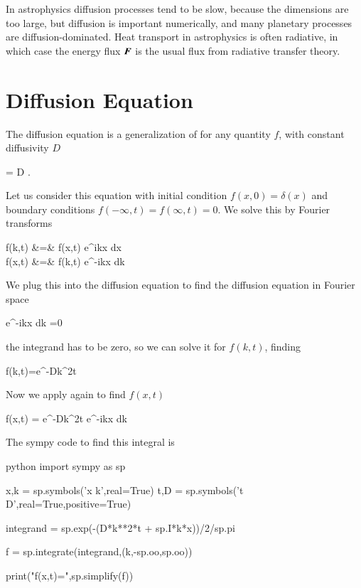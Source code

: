 In astrophysics diffusion processes tend to be slow, because the
dimensions are too large, but diffusion is important numerically, and
many planetary processes are diffusion-dominated. Heat transport in
astrophysics is often radiative, in which case the energy flux ${\boldsymbol{F}}$ is
the usual flux from radiative transfer theory. 

\section{Diffusion Equation}

The diffusion equation is a generalization of 
for any quantity $f$, with constant diffusivity $D$

\beq
{} = D .
\eeq

Let us consider this equation with initial condition $f(x,0)=\delta(x)$ and boundary conditions
$f(-\infty,t)=f(\infty,t)=0$. We solve this by Fourier transforms

\beqn
f(k,t) &=& \int f(x,t) e^{ikx} dx \label{eq:fourier-kx}\\
f(x,t) &=& \int f(k,t) e^{-ikx} dk \label{eq:fourier-xk}
\eeqn


We plug  this into the diffusion equation to find
the diffusion equation in Fourier space

\beq
\int {}e^{-ikx} dk =0
\eeq

\noindent the integrand has to be zero, so we can solve it for
$f(k,t)$, finding 

\beq
f(k,t)=e^{-Dk^2t}
\eeq

Now we apply  again to find $f(x,t)$

\beq
f(x,t) = \int e^{-Dk^2t} e^{-ikx} dk 
\eeq

The sympy code to find this integral is

\begin{mintedbox}{python}
import sympy as sp

x,k = sp.symbols('x k',real=True)
t,D = sp.symbols('t D',real=True,positive=True)

integrand = sp.exp(-(D*k**2*t + sp.I*k*x))/2/sp.pi

f = sp.integrate(integrand,(k,-sp.oo,sp.oo))

print("f(x,t)=",sp.simplify(f))
\end{mintedbox} 

